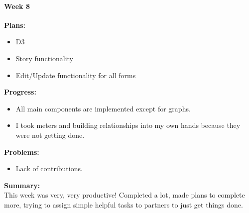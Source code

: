\paragraph{Week 8}
\begin{adjustwidth}{2.5em}{0pt}
    \vspace{-0.5cm}\textbf{Plans:}
    \vspace{-0.5cm}
    \begin{itemize}
        \item D3
        \item Story functionality
        \item Edit/Update functionality for all forms
    \end{itemize} 
    \vspace{-0.3cm}\textbf{Progress:}
    \vspace{-0.5cm}
    \begin{itemize}
        \item All main components are implemented except for graphs.
        \item I took meters and building relationships into my own hands because they were not getting done. 
    \end{itemize} 
    \vspace{-0.3cm}\textbf{Problems:}
    \vspace{-0.5cm}
    \begin{itemize}
        \item Lack of contributions.
    \end{itemize}  
    \vspace{-0.3cm}\noindent\textbf{Summary:}\\
    \noindent This week was very, very productive! Completed a lot, made plans to complete more, trying to assign simple helpful tasks to partners to just get things done. 
\end{adjustwidth} 
